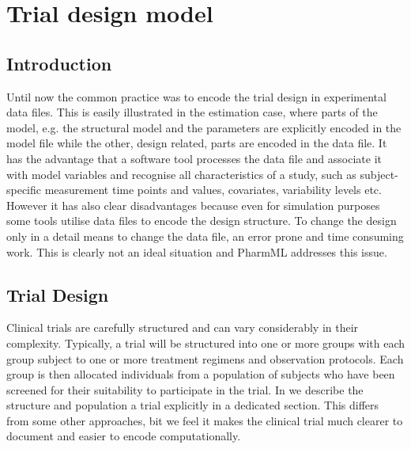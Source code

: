 \chapter{Trial design model}
\label{sec:CTS}
\label{maths:epoch-defn}

\section{Introduction}

Until now the common practice was to encode the trial design in experimental data files. This is easily illustrated in the estimation case, where parts of the model, e.g. the structural model and the parameters are explicitly encoded in the model file while the other, design related, parts are encoded in the data file. It has the advantage that a software tool processes the data file and associate it with model variables and recognise all characteristics of a study, such as subject-specific measurement time points and values, covariates, variability levels etc. However it has also clear disadvantages because even for simulation purposes some tools utilise data files to encode the design structure. To change the design only in a detail means to change the data file, an error prone and time consuming work. This is clearly not an ideal situation and PharmML addresses this issue.


\section{Trial Design}

Clinical trials are carefully structured and can vary considerably in
their complexity. Typically, a trial will be structured into one or
more groups with each group subject to one or more treatment regimens
and observation protocols. Each group is then allocated individuals
from a population of subjects who have been screened for their
suitability to participate in the trial. In \pharmml we describe the structure and population a trial
explicitly in a dedicated section. This differs from some other
approaches, bit we feel it makes the clinical trial much clearer to
document and easier to encode computationally. 

